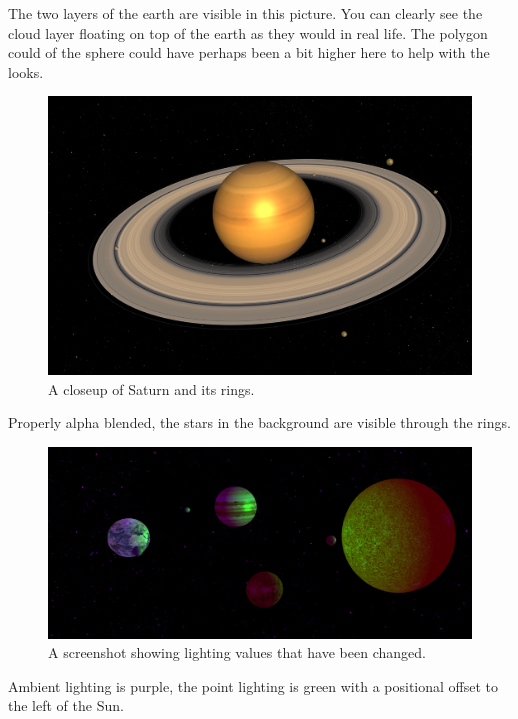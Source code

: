 \documentclass{scrreprt}
\begin{document}
The two layers of the earth are visible in this picture. You can clearly see the cloud layer floating on top of the earth as they would in real life. The polygon could of the sphere could have perhaps been a bit higher here to help with the looks.

\begin{figure}[H]
\includegraphics[width=\textwidth]{images/saturncloseup}
\caption{A closeup of Saturn and its rings.}
\end{figure}

Properly alpha blended, the stars in the background are visible through the rings.

\begin{figure}[H]
\includegraphics[width=\textwidth]{images/lighting}
\caption{A screenshot showing lighting values that have been changed.}
\end{figure}

Ambient lighting is purple, the point lighting is green with a positional offset to the left of the Sun.
\end{document}
